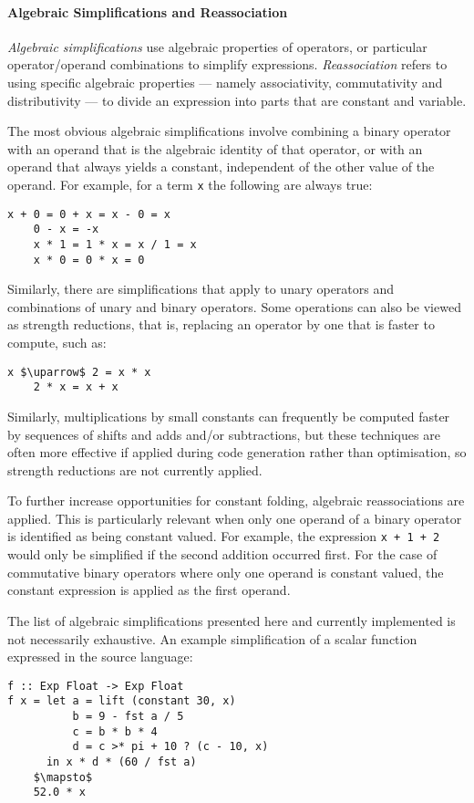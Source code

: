 \paragraph{Algebraic Simplifications and Reassociation}

\emph{Algebraic simplifications} use algebraic properties of operators, or
particular operator/operand combinations to simplify expressions.
\emph{Reassociation} refers to using specific algebraic properties --- namely
associativity, commutativity and distributivity --- to divide an expression into
parts that are constant and variable.

The most obvious algebraic simplifications involve combining a binary operator
with an operand that is the algebraic identity of that operator, or with an
operand that always yields a constant, independent of the other value of the
operand. For example, for a term \texttt{x} the following are always true:
%
\begin{lstlisting}[style=Haskell,numbers=none,mathescape]
    x + 0 = 0 + x = x - 0 = x
    0 - x = -x
    x * 1 = 1 * x = x / 1 = x
    x * 0 = 0 * x = 0
\end{lstlisting}
%
Similarly, there are simplifications that apply to unary operators and
combinations of unary and binary operators. Some operations can also be viewed
as strength reductions, that is, replacing an operator by one that is faster to
compute, such as:
%
\begin{lstlisting}[style=Haskell,numbers=none,mathescape]
    x $\uparrow$ 2 = x * x
    2 * x = x + x
\end{lstlisting}
%
Similarly, multiplications by small constants can frequently be computed faster
by sequences of shifts and adds and/or subtractions, but these techniques are
often more effective if applied during code generation rather than optimisation,
so strength reductions are not currently applied.

To further increase opportunities for constant folding, algebraic reassociations
are applied. This is particularly relevant when only one operand of a binary
operator is identified as being constant valued. For example, the expression
\lstinline{x + 1 + 2} would only be simplified if the second addition occurred
first. For the case of commutative binary operators where only one operand is
constant valued, the constant expression is applied as the first operand.

The list of algebraic simplifications presented here and currently implemented
is not necessarily exhaustive. An example simplification of a scalar function
expressed in the source language:
%
\begin{lstlisting}[style=Haskell,mathescape]
f :: Exp Float -> Exp Float
f x = let a = lift (constant 30, x)
          b = 9 - fst a / 5
          c = b * b * 4
          d = c >* pi + 10 ? (c - 10, x)
      in x * d * (60 / fst a)
    $\mapsto$
    52.0 * x
\end{lstlisting}



